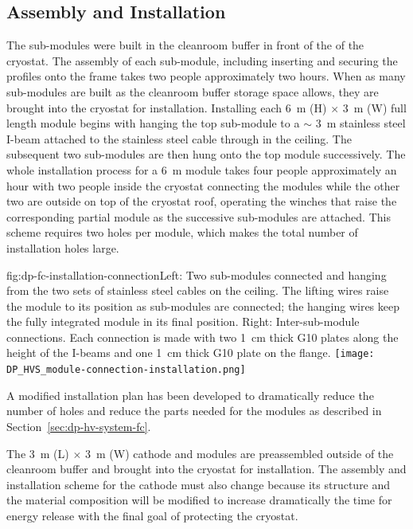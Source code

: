 \subsection{Assembly and Installation}
\label{sec:fddp-hv-protodune-lessons-assy}

The  sub-modules were built in the cleanroom buffer in front of the  of the  cryostat.
The assembly of each sub-module, including inserting and securing the profiles onto the  frame takes two people approximately two hours.
When as many sub-modules are built as the cleanroom buffer storage space allows, they are brought into the cryostat for installation.
Installing each \SI{6}{\m} (H) $\times$ \SI{3}{\m} (W) full length module begins with hanging the top sub-module to a $\sim$ \SI{3}{\m} stainless steel I-beam attached to the stainless steel cable through \fdth in the ceiling.
The subsequent two sub-modules are then hung onto the top module successively.
The whole installation process for a \SI{6}{\m} module takes four people approximately an hour with two people inside the cryostat connecting the modules while the other two are outside on top of the cryostat roof, operating the winches that raise the corresponding partial module as the successive sub-modules are attached.
This scheme requires two \fdth holes per module, which makes the total number of  installation \fdth holes large.

\begin{dunefigure}{fig:dp-fc-installation-connection}{Left: Two sub-modules connected and hanging from the two sets of stainless steel cables on the ceiling.  The lifting wires raise the module to its position as sub-modules are connected; the hanging wires keep the fully integrated module in its final position.  Right: Inter-sub-module connections.  Each connection is made with two \SI{1}{cm} thick G10 plates along the height of the I-beams and one \SI{1}{cm} thick G10 plate on the flange.}
\texttt{[image: DP\_HVS\_module-connection-installation.png]}
\end{dunefigure}

A modified installation plan has been developed to dramatically reduce the number of \fdth holes and reduce the parts needed for the  modules as described in Section~\ref{sec:dp-hv-system-fc}.

The \SI{3}{\m} (L) $\times$ \SI{3}{\m} (W)  cathode and  modules are preassembled outside of the cleanroom buffer and brought into the cryostat for installation.
The assembly and installation scheme for the   cathode must also change because its structure and the material composition will be modified to increase dramatically the time for energy release with the final goal of protecting the cryostat.

